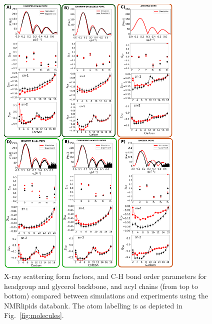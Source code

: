 \documentclass[journal=jacsat,manuscript=article,layout=singlecolumn]{achemso}
\begin{document}
\begin{figure}[!hbt]
    \centering
    \includegraphics[width=0.8\textwidth]{Figures/quality.pdf}
    \caption{X-ray scattering form factors, and C-H bond order parameters for headgroup and glycerol backbone, and acyl chains (from top to bottom) compared between simulations and experiments using the NMRlipids databank. The atom labelling is as depicted in Fig.~\ref{fig:molecules}.}
    \label{fig:order_parameters}

\end{figure}
\end{document}
